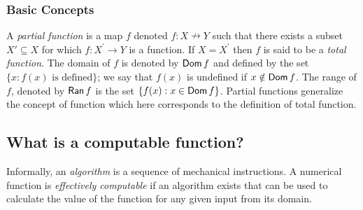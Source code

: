 \subsubsection*{Basic Concepts}
A \emph{partial function} is a map $f$ denoted $f : X \nrightarrow Y$ such that there exists a subset $X' \subseteq X$ for which $f : X^\prime \to Y$ is a function. If $X = X^\prime$ then $f$ is said to be a \emph{total function}. The domain of $f$ is denoted by $\operatorname{\mathsf{Dom}} f$ and defined by the set $\{ x : f(x) \text{ is defined} \}$; we say that $f(x)$ is undefined if $x \notin \operatorname{\mathsf{Dom}} f$. The range of $f$, denoted by $\operatorname{\mathsf{Ran}} f$ is the set $\{ f(x) : x \in \operatorname{\mathsf{Dom}} f \}$. Partial functions generalize the concept of function which here corresponds to the definition of total function. 

\subsection{What is a computable function?}
Informally, an \emph{algorithm} is a sequence of mechanical instructions. A numerical function is \emph{effectively computable} if an algorithm exists that can be used to calculate the value of the function for any given input from its domain.
